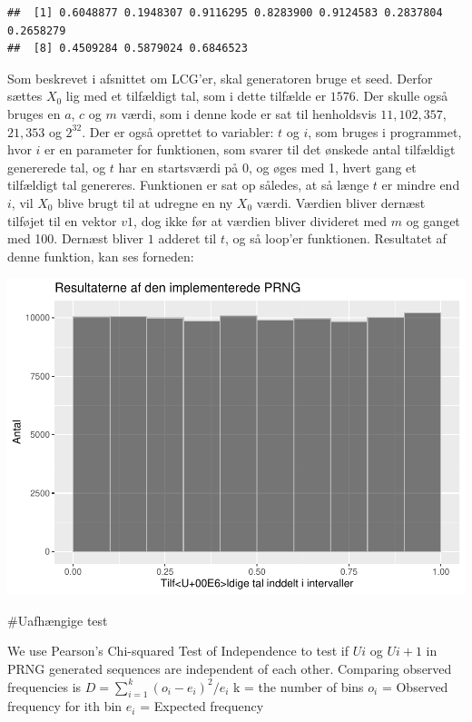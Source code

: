 \documentclass[
]{article}
\begin{document}
\begin{verbatim}
##  [1] 0.6048877 0.1948307 0.9116295 0.8283900 0.9124583 0.2837804 0.2658279
##  [8] 0.4509284 0.5879024 0.6846523
\end{verbatim}

Som beskrevet i afsnittet om LCG'er, skal generatoren bruge et seed.
Derfor sættes \(X_0\) lig med et tilfældigt tal, som i dette tilfælde er
\(1576\). Der skulle også bruges en \(a\), \(c\) og \(m\) værdi, som i
denne kode er sat til henholdsvis \(11,102,357\), \(21,353\) og
\(2^{32}\). Der er også oprettet to variabler: \(t\) og \(i\), som
bruges i programmet, hvor \(i\) er en parameter for funktionen, som
svarer til det ønskede antal tilfældigt genererede tal, og \(t\) har en
startsværdi på 0, og øges med 1, hvert gang et tilfældigt tal genereres.
Funktionen er sat op således, at så længe \(t\) er mindre end \(i\), vil
\(X_0\) blive brugt til at udregne en ny \(X_0\) værdi. Værdien bliver
dernæst tilføjet til en vektor \(v1\), dog ikke før at værdien bliver
divideret med \(m\) og ganget med 100. Dernæst bliver \(1\) adderet til
\(t\), og så loop'er funktionen. Resultatet af denne funktion, kan ses
forneden:

\includegraphics{TP2_files/figure-latex/Linear Congruence-1.pdf}

\#Uafhængige test

We use Pearson's Chi-squared Test of Independence to test if \(U{i}\) og
\(U{i + 1}\) in PRNG generated sequences are independent of each other.
Comparing observed frequencies is \(D=\sum_{i=1}^{k}(o_i-e_i)^2/e_i\) k
= the number of bins \(o_i\) = Observed frequency for ith bin \(e_i\) =
Expected frequency
\end{document}
